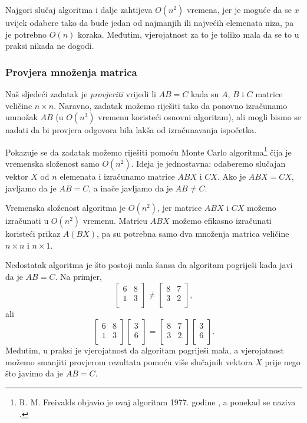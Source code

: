 Najgori slučaj algoritma i dalje zahtijeva $O(n^2)$ vremena,
jer je moguće da se $x$ uvijek odabere
tako da bude jedan od najmanjih ili najvećih
elemenata niza, pa je potrebno $O(n)$ koraka.
Međutim, vjerojatnost za to je toliko mala
da se to u praksi nikada ne dogodi.

\subsubsection{Provjera množenja matrica}


Naš sljedeći zadatak je \emph{provjeriti}
vrijedi li $AB=C$ kada su $A$, $B$ i $C$
matrice veličine $n \times n$.
Naravno, zadatak možemo riješiti
tako da ponovno izračunamo umnožak $AB$
(u $O(n^3)$ vremenu koristeći osnovni algoritam),
ali mogli bismo se nadati da bi provjera
odgovora bila lakša od izračunavanja ispočetka.

Pokazuje se da zadatak možemo riješiti
pomoću Monte Carlo algoritma\footnote{R. M. Freivalds objavio je
ovaj algoritam 1977. godine \cite{fre77}, a ponekad se
naziva  .} čija
je vremenska složenost samo $O(n^2)$.
Ideja je jednostavna: odaberemo slučajan vektor
$X$ od $n$ elemenata i izračunamo matrice
$ABX$ i $CX$. Ako je $ABX=CX$, javljamo da je $AB=C$,
a inače javljamo da je $AB \neq C$.

Vremenska složenost algoritma je
$O(n^2)$, jer matrice
$ABX$ i $CX$ možemo izračunati u $O(n^2)$ vremenu.
Matricu $ABX$ možemo efikasno izračunati
koristeći prikaz $A(BX)$, pa su potrebna samo dva
množenja matrica veličine $n \times n$ i $n \times 1$.

Nedostatak algoritma je
što postoji mala šansa da algoritam
pogriješi kada javi da je $AB=C$.
Na primjer, 
\[
 \begin{bmatrix}
  6 & 8 \\
  1 & 3 \\
 \end{bmatrix}
\neq
 \begin{bmatrix}
  8 & 7 \\
  3 & 2 \\
 \end{bmatrix},
\]
ali
\[
 \begin{bmatrix}
  6 & 8 \\
  1 & 3 \\
 \end{bmatrix}
 \begin{bmatrix}
  3 \\
  6 \\
 \end{bmatrix}
=
 \begin{bmatrix}
  8 & 7 \\
  3 & 2 \\
 \end{bmatrix}
 \begin{bmatrix}
  3 \\
  6 \\
 \end{bmatrix}.
\]
Međutim, u praksi je vjerojatnost da
algoritam pogriješi mala,
a vjerojatnost možemo smanjiti
provjerom rezultata pomoću više slučajnih vektora $X$
prije nego što javimo da je $AB=C$.

